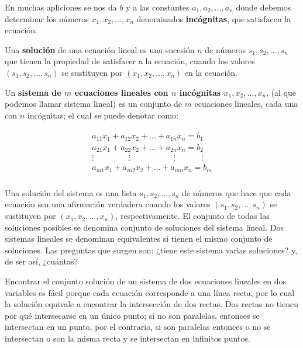 \documentclass{article}
\begin{document}
En muchas apliciones se nos da $b$ y a las constantes $ a_1,a_2,\dots, a_n $ donde debemos determinar los números $ x_1,x_2,\dots, x_n $ denominados \textbf{incógnitas}, que satisfacen la ecuación.

Una \textbf{solución} de una ecuación lineal es una sucesión $ n $ de números $ s_1,s_2,\dots, s_n $ que tienen la propiedad de satisfacer a la ecuación, cuando los valores $(s_1, s_2, \dots, s_n)$ se sustituyen por $(x_1, x_2, \dots, x_n)$ en la ecuación.

Un \textbf{sistema de $m$ ecuaciones lineales con $n$ incógnitas $ x_1,x_2,\dots, x_n $}, (al que podemos llamar sistema lineal) es un conjunto de $m$ ecuaciones lineales, cada una con $ n $ incógnitas; el cual se puede denotar como:

\begin{equation}
    \begin{matrix}
        \begin{aligned}
            a_{11}x_1 + a_{12}x_2 + \dots + a_{1n}x_n = b_1\\
            a_{21}x_1 + a_{22}x_2 + \dots + a_{2n}x_n = b_2\\
            \vdots \phantom{aaaaaaaa} \vdots \phantom{aaaaaaaaaa} \vdots \phantom{aaaaaa} \vdots\\
            a_{m1}x_1 + a_{m2}x_2 + \dots + a_{mn}x_n = b_m\\
        \end{aligned}
    \end{matrix}
\end{equation}

\pagebreak

Una solución del sistema es una lista $s_1, s_2, \dots, s_n$ de números que hace que cada ecuación sea una afirmación verdadera cuando los valores $(s_1, s_2, \dots, s_n)$ se sustituyen por $(x_1, x_2, \dots, x_n)$, respectivamente. El conjunto de todas las soluciones posibles se denomina conjunto de soluciones del sistema lineal. Dos sistemas lineales se denominan equivalentes si tienen el mismo conjunto de soluciones. Las preguntas que surgen son: ¿tiene este sistema varias soluciones? y, de ser así, ¿cuántas? 

Encontrar el conjunto solución de un sistema de dos ecuaciones lineales en dos variables es fácil porque cada ecuación corresponde a una línea recta, por lo cual la solución equivale a encontrar la intersección de dos rectas. Dos rectas no tienen por qué intersecarse en un único punto; si no son paralelas, entonces se intersectan en un punto, por el contrario, si son paralelas entonces o no se intersectan o son la misma recta y se intersectan en infinitos puntos. \cite{kolman}
\end{document}
